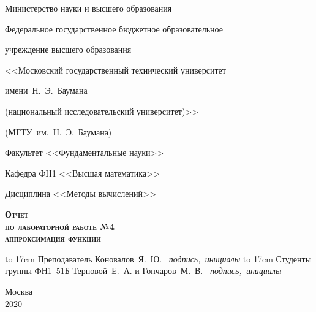 \documentclass[a4paper,12pt]{extarticle}
\begin{document}
    \begin{titlepage}

        \begin{center}
            \centerline{\Large\rm Министерство науки и высшего образования}
            \centerline{\Large\rm Федеральное государственное бюджетное образовательное}
            \centerline{\Large\rm учреждение высшего образования}
            \centerline{\Large\rm <<Московский государственный технический университет}
            \centerline{\Large\rm имени~Н.~Э.~Баумана}
            \centerline{\Large\rm (национальный исследовательский университет)>>}
            \centerline{\Large\rm (МГТУ~им.~Н.~Э.~Баумана)}
            \hrulefill
        \end{center}

        \begin{figure}[h!]
            \centering
        \end{figure}

        \begin{center}
            \centerline{\Large\rm Факультет <<Фундаментальные науки>>}
            \centerline{\Large\rm Кафедра ФН1 <<Высшая математика>>}
            \centerline{\Large\rm Дисциплина <<Методы вычислений>>}
        \end{center}

        \begin{center}
            \textsc{\textbf{\Huge Отчет}}\\
            \textsc{\textbf{\large по лабораторной работе №4}}\\
            \textsc{\textbf{\large аппроксимация функции}}\\
        \end{center}

        \vspace{3em}

        {
        \large
        \hbox to 17cm {Преподаватель \hspace{45pt} \hrulefill \hspace{60pt} Коновалов~Я.~Ю.}
        \vspace{-7pt}
        \hbox{{\small\it \hspace{178pt} подпись, инициалы}}
        \hbox{}
        \hbox to 17cm {Студенты группы ФН1--51Б \hrulefill \hspace{1pt} Терновой~Е.~А. и Гончаров~М.~В.}
        \vspace{-7pt}
        \hbox{{\small\it \hspace{178pt} подпись, инициалы}}
        }


        \vspace{\fill}

        \begin{center}
            \large	Москва \\2020
        \end{center}

    \end{titlepage}
\end{document}

